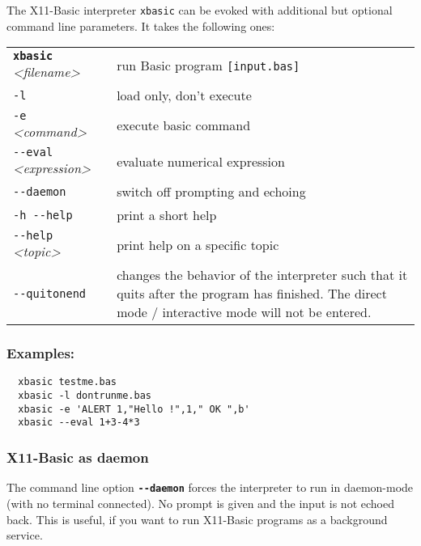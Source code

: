 The X11-Basic interpreter \verb|xbasic| can be evoked with  additional but
optional command line parameters. It takes the following ones:

\begin{longtable}{lp{11cm}}
  {\tt\bf xbasic} {\it<filename>} & run Basic program \verb|[input.bas]|\\
  \verb|-l|                       & load only, don't execute\\
  \verb|-e| {\it<command>}        & execute basic command \\
  \verb|--eval| {\it<expression>} & evaluate numerical expression  \\
  \verb|--daemon|                 & switch off prompting and echoing\\
  \verb|-h --help|                & print a short help \\
  \verb|--help|  {\it<topic>}	  & print help on a specific topic\\
  \verb|--quitonend|              & changes the behavior of the interpreter such 
  that it quits after the program  has  finished.
  The direct mode / interactive mode will not be entered.\\
\end{longtable}

\begin{mdframed}[hidealllines=true,backgroundcolor=black!20]
\subsubsection*{Examples:}
\begin{verbatim}
  xbasic testme.bas
  xbasic -l dontrunme.bas
  xbasic -e 'ALERT 1,"Hello !",1," OK ",b'
  xbasic --eval 1+3-4*3
\end{verbatim}
\end{mdframed}

\subsubsection*{X11-Basic as daemon}

The command line option {\bf \verb|--daemon|} forces the interpreter to run in
daemon-mode (with no terminal connected). No prompt is given and the 
input is not echoed back. This is useful, if you want to run X11-Basic
programs as a background service.
  
%

